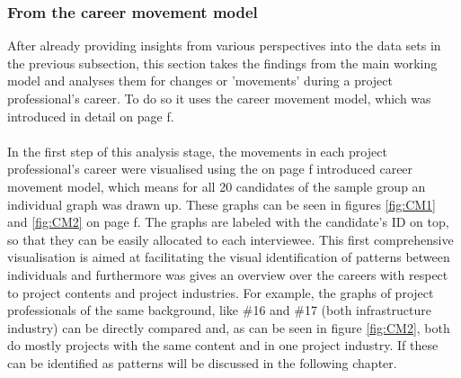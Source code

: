 
\subsubsection{From the career movement model}

After already providing insights from various perspectives into the data sets in the previous subsection, this section takes the findings from the main working model and analyses them for changes or 'movements' during a project professional's career. To do so it uses the career movement model, which was introduced in detail on page \pageref{fig:alternate}f.  \\





\\[.1cm]
In the first step of this analysis stage, the movements in each project professional's career were visualised using the on page \pageref{sec:cmm}f introduced career movement model, which means for all 20 candidates of the sample group an individual graph was drawn up. These graphs can be seen in figures \ref{fig:CM1} and \ref{fig:CM2} on page \pageref{fig:CM1}f. The graphs are labeled with the candidate's ID on top, so that they can be easily allocated to each interviewee. This first comprehensive visualisation is aimed at facilitating the visual identification of patterns between individuals and furthermore was gives an overview over the careers with respect to project contents and project industries. For example, the graphs of project professionals of the same background, like \#16 and \#17 (both infrastructure industry) can be directly compared and, as can be seen in figure \ref{fig:CM2}, both do mostly projects with the same content and in one project industry. If these can be identified as patterns will be discussed in the following chapter.\\




